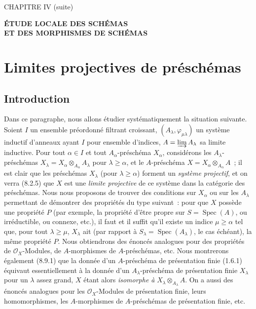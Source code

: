 \label{chapter:IV3-fr}

\begin{center}
{\large CHAPITRE IV (suite)\par}
\vspace{1.5em}
{\Large\bfseries ÉTUDE LOCALE DES SCHÉMAS\\
ET DES MORPHISMES DE SCHÉMAS\par}
\end{center}

\setcounter{section}{7}
\section{Limites projectives de préschémas}
\label{section:IV.8-fr}

\setcounter{subsection}{0}
\subsection{Introduction}
\label{subsection:IV.8.1-fr}

\begin{env}[8.1.1]
\label{IV.8.1.1-fr}
Dans ce paragraphe, nous allons étudier systématiquement la situation
suivante. Soient $I$ un ensemble préordonné filtrant croissant,
$(A_\lambda,\varphi_{\mu\lambda})$ un système inductif d'anneaux ayant $I$
pour ensemble d'indices, $A=\varinjlim A_\lambda$ sa limite inductive. Pour
tout $\alpha\in I$ et tout $A_\alpha$-préschéma $X_\alpha$, considérons les
$A_\lambda$-préschémas
$X_\lambda=X_\alpha\otimes_{A_\alpha}A_\lambda$ pour $\lambda\geq\alpha$,
et le $A$-préschéma $X=X_\alpha\otimes_{A_\alpha}A$~; il est clair que les
préschémas $X_\lambda$ (pour $\lambda\geq\alpha$) forment un \emph{système
projectif}, et on verra (8.2.5) que $X$ est une \emph{limite projective} de ce
système dans la catégorie des préschémas. Nous nous proposons de trouver des
conditions sur $X_\alpha$ ou sur les $A_\lambda$ permettant de démontrer des
propriétés du type suivant~: pour que $X$ possède une propriété $P$ (par
exemple, la propriété d'être propre sur $S=\operatorname{Spec}(A)$, ou
irréductible, ou connexe, etc.), il faut et il suffit qu'il existe un indice
$\mu\geq\alpha$ tel que, pour tout $\lambda\geq\mu$, $X_\lambda$ ait (par
rapport à $S_\lambda=\operatorname{Spec}(A_\lambda)$, le cas échéant), la
même propriété $P$. Nous obtiendrons des énoncés analogues pour des propriétés
de $\mathcal O_X$-Modules, de $A$-morphismes de $A$-préschémas, etc. Nous
montrerons également (8.9.1) que la donnée d'un $A$-préschéma de présentation
finie (1.6.1) équivaut essentiellement à la donnée d'un $A_\lambda$-préschéma
de présentation finie $X_\lambda$ pour un $\lambda$ assez grand, $X$ étant
alors \emph{isomorphe à} $X_\lambda\otimes_{A_\lambda}A$. On a aussi des
énoncés analogues pour les $\mathcal O_X$-Modules de présentation finie,
leurs homomorphismes, les $A$-morphismes de $A$-préschémas de présentation
finie, etc.
\end{env}

